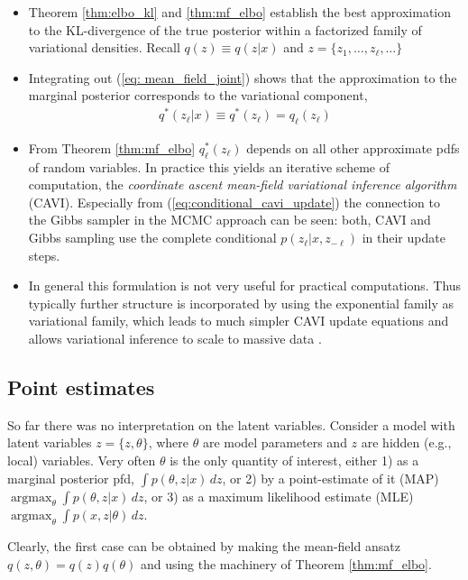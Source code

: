 \begin{itemize}
\item  Theorem \ref{thm:elbo_kl} and \ref{thm:mf_elbo} establish the best approximation to the KL-divergence of the true posterior within a factorized family of variational densities. Recall $q(z)\equiv q(z|x)$ and $z=\{z_1,\dots,z_\ell, \dots\}$
\item Integrating out (\ref{eq: mean_field_joint}) shows that the approximation to the marginal posterior corresponds to the variational component, 
\begin{align}
	q^*(z_\ell | x) \equiv  q^*(z_\ell) = q_\ell(z_\ell)
\end{align}
\item   From Theorem \ref{thm:mf_elbo}  $q^*_\ell(z_\ell)$  depends on all other  approximate pdfs of random variables. In practice this yields an iterative scheme of computation, the \textit{coordinate ascent mean-field variational inference algorithm} (CAVI)\cite{blei2016variational, Bishop:2006:PRM:1162264}. Especially from (\ref{eq:conditional_cavi_update}) the connection to the Gibbs sampler in the MCMC approach \cite{doi:10.1080/01621459.1990.10476213, Geman:1984:SRG:2286442.2286617} can be seen: both, CAVI and Gibbs sampling use the complete conditional $p(z_\ell | x, z_{-\ell})$ in their update steps.	
\item  In general this formulation is not very useful for  practical computations. Thus  typically further structure is incorporated by using the exponential family as variational family, which leads to much simpler CAVI update equations and allows variational inference to scale to massive data \cite{blei2016variational, Bernardo03thevariational, MAL-001}.
\end{itemize}
  
\subsection{Point estimates}  
So far there was no interpretation on the latent variables. Consider a model with latent variables $z=\{z,\theta\}$, where $\theta$ are model parameters and $z$ are hidden (e.g., local) variables. Very often $\theta$ is the only quantity of interest, either 1) as a marginal posterior pfd, $\int p(\theta, z|x)\,dz$, or 2) by a point-estimate of it (MAP)  $\operatorname{argmax}_\theta \int p(\theta, z|x)\,dz$, or 3) as a maximum likelihood estimate (MLE)  $\operatorname{argmax}_\theta \int p(x, z|\theta)\,dz$. 

Clearly, the first case can be obtained by making the mean-field ansatz $q(z,\theta) = q(z)q(\theta)$ and using the machinery of Theorem \ref{thm:mf_elbo}.
  
